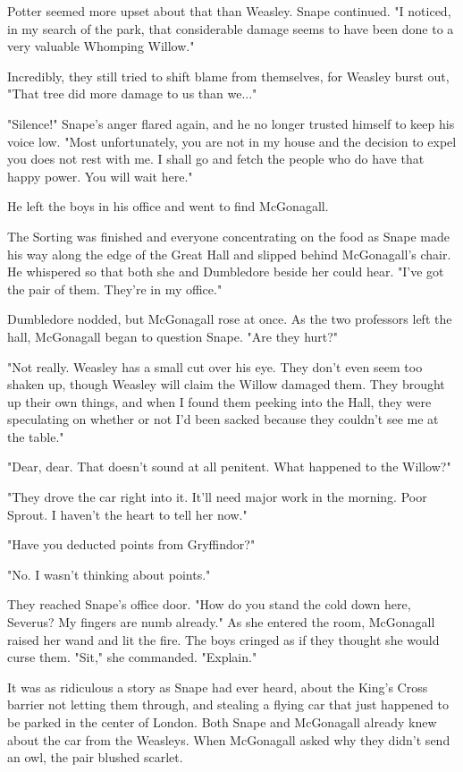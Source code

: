 \documentclass[a4paper,11pt]{article}
\begin{document}
Potter seemed more upset about that than Weasley. Snape continued. "I noticed, in my search of the park, that considerable damage seems to have been done to a very valuable Whomping Willow."

Incredibly, they still tried to shift blame from themselves, for Weasley burst out, "That tree did more damage to us than we..."

"Silence!" Snape's anger flared again, and he no longer trusted himself to keep his voice low. "Most unfortunately, you are not in my house and the decision to expel you does not rest with me. I shall go and fetch the people who do have that happy power. You will wait here."

He left the boys in his office and went to find McGonagall.

The Sorting was finished and everyone concentrating on the food as Snape made his way along the edge of the Great Hall and slipped behind McGonagall's chair. He whispered so that both she and Dumbledore beside her could hear. "I've got the pair of them. They're in my office."

Dumbledore nodded, but McGonagall rose at once. As the two professors left the hall, McGonagall began to question Snape. "Are they hurt?"

"Not really. Weasley has a small cut over his eye. They don't even seem too shaken up, though Weasley will claim the Willow damaged them. They brought up their own things, and when I found them peeking into the Hall, they were speculating on whether or not I'd been sacked because they couldn't see me at the table."

"Dear, dear. That doesn't sound at all penitent. What happened to the Willow?"

"They drove the car right into it. It'll need major work in the morning. Poor Sprout. I haven't the heart to tell her now."

"Have you deducted points from Gryffindor?"

"No. I wasn't thinking about points."

They reached Snape's office door. "How do you stand the cold down here, Severus? My fingers are numb already." As she entered the room, McGonagall raised her wand and lit the fire. The boys cringed as if they thought she would curse them. "Sit," she commanded. "Explain."

It was as ridiculous a story as Snape had ever heard, about the King's Cross barrier not letting them through, and stealing a flying car that just happened to be parked in the center of London. Both Snape and McGonagall already knew about the car from the Weasleys. When McGonagall asked why they didn't send an owl, the pair blushed scarlet.
\end{document}
